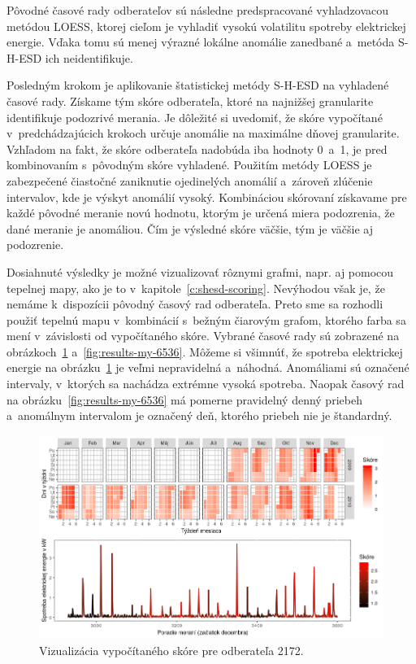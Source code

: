 \documentclass[a4paper,twoside,slovak,12pt,appendix]{article}
\begin{document}
Pôvodné časové rady odberateľov sú následne predspracované vyhladzovacou metódou
LOESS, ktorej cieľom je vyhladiť vysokú volatilitu spotreby elektrickej energie.
Vďaka tomu sú menej výrazné lokálne anomálie zanedbané a~metóda S-H-ESD ich
neidentifikuje.

Posledným krokom je aplikovanie štatistickej metódy S-H-ESD na vyhladené časové
rady. Získame tým skóre odberateľa, ktoré na najnižšej granularite identifikuje
podozrivé merania. Je dôležité si uvedomiť, že skóre vypočítané
v~predchádzajúcich krokoch určuje anomálie na maximálne dňovej granularite.
Vzhľadom na fakt, že skóre odberateľa nadobúda iba hodnoty 0~a~1, je pred
kombinovaním s~pôvodným skóre vyhladené. Použitím metódy LOESS je zabezpečené
čiastočné zaniknutie ojedinelých anomálií a~zároveň zlúčenie intervalov, kde je
výskyt anomálií vysoký. Kombináciou skórovaní získavame pre každé pôvodné
meranie novú hodnotu, ktorým je určená miera podozrenia, že dané meranie je
anomáliou. Čím je výsledné skóre väčšie, tým je väčšie aj podozrenie.

Dosiahnuté výsledky je možné vizualizovať rôznymi grafmi, napr. aj pomocou
tepelnej mapy, ako je to v~kapitole~\ref{c:shesd-scoring}. Nevýhodou však je, že
nemáme k~dispozícii pôvodný časový rad odberateľa. Preto sme sa rozhodli použiť
tepelnú mapu v~kombinácií s~bežným čiarovým grafom, ktorého farba sa mení
v~závislosti od vypočítaného skóre. Vybrané časové rady sú zobrazené na
obrázkoch~\ref{fig:results-my-2172} a~\ref{fig:results-my-6536}. Môžeme si
všimnúť, že spotreba elektrickej energie na obrázku~\ref{fig:results-my-2172}
je veľmi nepravidelná a~náhodná. Anomáliami sú označené intervaly, v~ktorých sa
nachádza extrémne vysoká spotreba. Naopak časový rad na
obrázku~\ref{fig:results-my-6536} má pomerne pravidelný denný priebeh
a~anomálnym intervalom je označený deň, ktorého priebeh nie je štandardný.

\begin{figure}[H]
  \centering
  \includegraphics[width=\textwidth]{results_my_2172.png}
  \caption{Vizualizácia vypočítaného skóre pre odberateľa 2172.}
	\label{fig:results-my-2172}
\end{figure}
\end{document}
